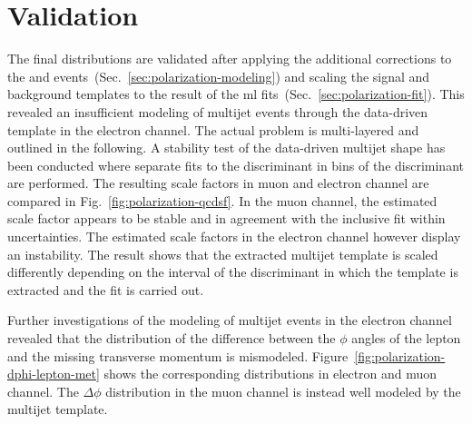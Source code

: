\section{Validation}

The final distributions are validated after applying the additional corrections to the \wjets and \ttbar events~(Sec.~\ref{sec:polarization-modeling}) and scaling the signal and background templates to the result of the \gls{ml} fits~(Sec.~\ref{sec:polarization-fit}). This revealed an insufficient modeling of multijet events through the data-driven template in the electron channel. The actual problem is multi-layered and outlined in the following. A stability test of the data-driven multijet shape has been conducted where separate fits to the \bdtqcd discriminant in bins of the \bdttch discriminant are performed. The resulting scale factors in muon and electron channel are compared in Fig.~\ref{fig:polarization-qcdsf}. In the muon channel, the estimated scale factor appears to be stable and in agreement with the inclusive fit within uncertainties. The estimated scale factors in the electron channel however display an instability. The result shows that the extracted multijet template is scaled differently depending on the interval of the \bdttch discriminant in which the template is extracted and the fit is carried out.


Further investigations of the modeling of multijet events in the electron channel revealed that the distribution of the difference between the $\phi$ angles of the lepton and the missing transverse momentum is mismodeled. Figure~\ref{fig:polarization-dphi-lepton-met} shows the corresponding distributions in electron and muon channel. The $\Delta\phi$ distribution in the muon channel is instead well modeled by the multijet template.


